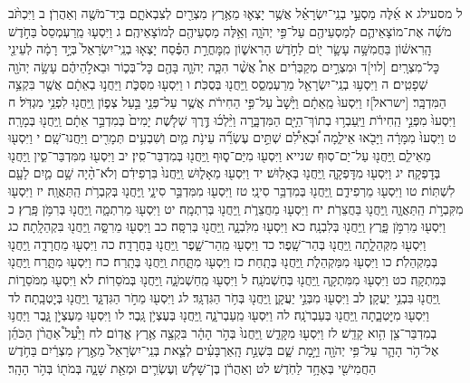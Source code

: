 \documentclass[twoside, openany, parskip=half, 11pt]{book}
\begin{document}
ל מסעילג א אֵ֜לֶּה מַסְעֵ֣י בְנֵֽי־יִשְׂרָאֵ֗ל אֲשֶׁ֥ר יָצְא֛וּ מֵאֶ֥רֶץ מִצְרַ֖יִם לְצִבְאֹתָ֑ם בְּיַד־מֹשֶׁ֖ה וְאַהֲרֹֽן׃ ב וַיִּכְתֹּ֨ב מֹשֶׁ֜ה אֶת־מוֹצָאֵיהֶ֛ם לְמַסְעֵיהֶ֖ם עַל־פִּ֣י יְהֹוָ֑ה וְאֵ֥לֶּה מַסְעֵיהֶ֖ם לְמוֹצָאֵיהֶֽם׃ ג וַיִּסְע֤וּ מֵֽרַעְמְסֵס֙ בַּחֹ֣דֶשׁ הָֽרִאשׁ֔וֹן בַּחֲמִשָּׁ֥ה עָשָׂ֛ר י֖וֹם לַחֹ֣דֶשׁ הָרִאשׁ֑וֹן מִֽמׇּחֳרַ֣ת הַפֶּ֗סַח יָצְא֤וּ בְנֵֽי־יִשְׂרָאֵל֙ בְּיָ֣ד רָמָ֔ה לְעֵינֵ֖י כׇּל־מִצְרָֽיִם׃ [לוי]ד וּמִצְרַ֣יִם מְקַבְּרִ֗ים אֵת֩ אֲשֶׁ֨ר הִכָּ֧ה יְהֹוָ֛ה בָּהֶ֖ם כׇּל־בְּכ֑וֹר וּבֵאלֹ֣הֵיהֶ֔ם עָשָׂ֥ה יְהֹוָ֖ה שְׁפָטִֽים׃ ה וַיִּסְע֥וּ בְנֵֽי־יִשְׂרָאֵ֖ל מֵרַעְמְסֵ֑ס וַֽיַּחֲנ֖וּ בְּסֻכֹּֽת׃ ו וַיִּסְע֖וּ מִסֻּכֹּ֑ת וַיַּחֲנ֣וּ בְאֵתָ֔ם אֲשֶׁ֖ר בִּקְצֵ֥ה הַמִּדְבָּֽר׃ [ישראל]ז וַיִּסְעוּ֙ מֵֽאֵתָ֔ם וַיָּ֙שׇׁב֙ עַל־פִּ֣י הַחִירֹ֔ת אֲשֶׁ֥ר עַל־פְּנֵ֖י בַּ֣עַל צְפ֑וֹן וַֽיַּחֲנ֖וּ לִפְנֵ֥י מִגְדֹּֽל׃ ח וַיִּסְעוּ֙ מִפְּנֵ֣י הַֽחִירֹ֔ת וַיַּֽעַבְר֥וּ בְתוֹךְ־הַיָּ֖ם הַמִּדְבָּ֑רָה וַיֵּ֨לְכ֜וּ דֶּ֣רֶךְ שְׁלֹ֤שֶׁת יָמִים֙ בְּמִדְבַּ֣ר אֵתָ֔ם וַֽיַּחֲנ֖וּ בְּמָרָֽה׃ ט וַיִּסְעוּ֙ מִמָּרָ֔ה וַיָּבֹ֖אוּ אֵילִ֑מָה וּ֠בְאֵילִ֠ם שְׁתֵּ֣ים עֶשְׂרֵ֞ה עֵינֹ֥ת מַ֛יִם וְשִׁבְעִ֥ים תְּמָרִ֖ים וַיַּחֲנוּ־שָֽׁם׃ י וַיִּסְע֖וּ מֵאֵילִ֑ם וַֽיַּחֲנ֖וּ עַל־יַם־סֽוּף׃ שנייא וַיִּסְע֖וּ מִיַּם־ס֑וּף וַֽיַּחֲנ֖וּ בְּמִדְבַּר־סִֽין׃ יב וַיִּסְע֖וּ מִמִּדְבַּר־סִ֑ין וַֽיַּחֲנ֖וּ בְּדׇפְקָֽה׃ יג וַיִּסְע֖וּ מִדׇּפְקָ֑ה וַֽיַּחֲנ֖וּ בְּאָלֽוּשׁ׃ יד וַיִּסְע֖וּ מֵאָל֑וּשׁ וַֽיַּחֲנוּ֙ בִּרְפִידִ֔ם וְלֹא־הָ֨יָה שָׁ֥ם מַ֛יִם לָעָ֖ם לִשְׁתּֽוֹת׃ טו וַיִּסְע֖וּ מֵרְפִידִ֑ם וַֽיַּחֲנ֖וּ בְּמִדְבַּ֥ר סִינָֽי׃ טז וַיִּסְע֖וּ מִמִּדְבַּ֣ר סִינָ֑י וַֽיַּחֲנ֖וּ בְּקִבְרֹ֥ת הַֽתַּאֲוָֽה׃ יז וַיִּסְע֖וּ מִקִּבְרֹ֣ת הַֽתַּאֲוָ֑ה וַֽיַּחֲנ֖וּ בַּחֲצֵרֹֽת׃ יח וַיִּסְע֖וּ מֵחֲצֵרֹ֑ת וַֽיַּחֲנ֖וּ בְּרִתְמָֽה׃ יט וַיִּסְע֖וּ מֵרִתְמָ֑ה וַֽיַּחֲנ֖וּ בְּרִמֹּ֥ן פָּֽרֶץ׃ כ וַיִּסְע֖וּ מֵרִמֹּ֣ן פָּ֑רֶץ וַֽיַּחֲנ֖וּ בְּלִבְנָֽה׃ כא וַיִּסְע֖וּ מִלִּבְנָ֑ה וַֽיַּחֲנ֖וּ בְּרִסָּֽה׃ כב וַיִּסְע֖וּ מֵרִסָּ֑ה וַֽיַּחֲנ֖וּ בִּקְהֵלָֽתָה׃ כג וַיִּסְע֖וּ מִקְּהֵלָ֑תָה וַֽיַּחֲנ֖וּ בְּהַר־שָֽׁפֶר׃ כד וַיִּסְע֖וּ מֵֽהַר־שָׁ֑פֶר וַֽיַּחֲנ֖וּ בַּחֲרָדָֽה׃ כה וַיִּסְע֖וּ מֵחֲרָדָ֑ה וַֽיַּחֲנ֖וּ בְּמַקְהֵלֹֽת׃ כו וַיִּסְע֖וּ מִמַּקְהֵלֹ֑ת וַֽיַּחֲנ֖וּ בְּתָֽחַת׃ כז וַיִּסְע֖וּ מִתָּ֑חַת וַֽיַּחֲנ֖וּ בְּתָֽרַח׃ כח וַיִּסְע֖וּ מִתָּ֑רַח וַֽיַּחֲנ֖וּ בְּמִתְקָֽה׃ כט וַיִּסְע֖וּ מִמִּתְקָ֑ה וַֽיַּחֲנ֖וּ בְּחַשְׁמֹנָֽה׃ ל וַיִּסְע֖וּ מֵֽחַשְׁמֹנָ֑ה וַֽיַּחֲנ֖וּ בְּמֹסֵרֽוֹת׃ לא וַיִּסְע֖וּ מִמֹּסֵר֑וֹת וַֽיַּחֲנ֖וּ בִּבְנֵ֥י יַעֲקָֽן׃ לב וַיִּסְע֖וּ מִבְּנֵ֣י יַעֲקָ֑ן וַֽיַּחֲנ֖וּ בְּחֹ֥ר הַגִּדְגָּֽד׃ לג וַיִּסְע֖וּ מֵחֹ֣ר הַגִּדְגָּ֑ד וַֽיַּחֲנ֖וּ בְּיׇטְבָֽתָה׃ לד וַיִּסְע֖וּ מִיׇּטְבָ֑תָה וַֽיַּחֲנ֖וּ בְּעַבְרֹנָֽה׃ לה וַיִּסְע֖וּ מֵֽעַבְרֹנָ֑ה וַֽיַּחֲנ֖וּ בְּעֶצְיֹ֥ן גָּֽבֶר׃ לו וַיִּסְע֖וּ מֵעֶצְיֹ֣ן גָּ֑בֶר וַיַּחֲנ֥וּ בְמִדְבַּר־צִ֖ן הִ֥וא קָדֵֽשׁ׃ לז וַיִּסְע֖וּ מִקָּדֵ֑שׁ וַֽיַּחֲנוּ֙ בְּהֹ֣ר הָהָ֔ר בִּקְצֵ֖ה אֶ֥רֶץ אֱדֽוֹם׃ לח וַיַּ֩עַל֩ אַהֲרֹ֨ן הַכֹּהֵ֜ן אֶל־הֹ֥ר הָהָ֛ר עַל־פִּ֥י יְהֹוָ֖ה וַיָּ֣מׇת שָׁ֑ם בִּשְׁנַ֣ת הָֽאַרְבָּעִ֗ים לְצֵ֤את בְּנֵֽי־יִשְׂרָאֵל֙ מֵאֶ֣רֶץ מִצְרַ֔יִם בַּחֹ֥דֶשׁ הַחֲמִישִׁ֖י בְּאֶחָ֥ד לַחֹֽדֶשׁ׃ לט וְאַהֲרֹ֔ן בֶּן־שָׁלֹ֧שׁ וְעֶשְׂרִ֛ים וּמְאַ֖ת שָׁנָ֑ה בְּמֹת֖וֹ בְּהֹ֥ר הָהָֽר׃
\end{document}
